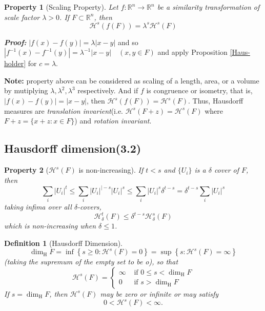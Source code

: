 \documentclass[12pt, a4paper]{article}
\newtheorem{definition}{Definition}[subsection]
\newtheorem{property}{Property}[subsection]
\begin{document}
\begin{property}[Scaling Property]
    Let $f: \mathbb{R}^{n} \rightarrow \mathbb{R}^{n}$ be a similarity transformation of scale factor $\lambda>0$. If $F \subset \mathbb{R}^{n}$, then
$$
\mathcal{H}^{s}(f(F))=\lambda^{s} \mathcal{H}^{s}(F)
$$
\end{property}

\textbf{\textit{Proof:}} $|f(x)-f(y)|=\lambda|x-y|$ and so $\left|f^{-1}(x)-f^{-1}(y)\right|=\lambda^{-1}|x-y| \quad(x, y \in F)$ and apply Proposition \ref{Haus-holder} for $c=\lambda$.

\textbf{Note: } property above can be considered as scaling of a length, area, or a volume by mutiplying $\lambda, \lambda^2, \lambda^3$ respectively. And if $f$ is congruence or isometry, that is, $|f(x)-f(y)| = |x-y|$, then $\mathcal{H}^s(f(F)) = \mathcal{H}^s(F)$. 
Thus, Hausdorff measures are \textit{translation invarient}(i.e. $\mathcal{H}^s(F+z) = \mathcal{H}^s(F)$ where $F+z = \{x+z:x\in F\}$) and \textit{rotation invariant}. 

\newpage
\subsection{Hausdorff dimension(3.2)}

\begin{property}[$\mathcal{H}^s(F)$ is non-increasing]
    If $t<s$ and $\{U_i\}$ is a $\delta$ cover of $F$, then
    $$
    \sum_{i}\left|U_{i}\right|^{t} \leq \sum_{i}\left|U_{i}\right|^{\mid-s}\left|U_{i}\right|^{s} \leq  \sum_{i}\left|U_{i}\right|^{s}\delta^{t-s} = \delta^{t-s} \sum_{i}\left|U_{i}\right|^{s}
    $$
    taking infima over all $\delta$-covers,
    $$
    \mathcal{H}^t_\delta(F)\leq \delta^{t-s}\mathcal{H}^s_\delta(F)
    $$
    which is non-increasing when $\delta\leq 1$.
\end{property}

\begin{definition}[Hausdorff Dimension]
    $$\operatorname{dim}_{\mathrm{H}} F=\inf \left\{s \geq 0: \mathcal{H}^{s}(F)=0\right\}=\sup \left\{s: \mathcal{H}^{s}(F)=\infty\right\}$$
(taking the supremum of the empty set to be o), so that
$$
\mathcal{H}^{s}(F)=\left\{\begin{array}{ll}
\infty & \text { if } 0 \leq s<\operatorname{dim}_{\mathrm{H}} F \\
0 & \text { if } s>\operatorname{dim}_{\mathrm{H}} F
\end{array}\right.
$$
If $s=\operatorname{dim}_{\mathrm{H}} F$, then $\mathcal{H}^{s}(F)$ may be zero or infinite or may satisfy
$$
0<\mathcal{H}^{s}(F)<\infty .
$$
\end{definition}
\end{document}

